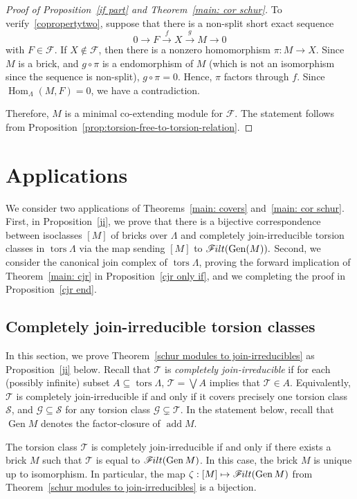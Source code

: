 \documentclass[ALCO,ThmDefs,Unicode,epreuves]{cedram}
\DeclareMathOperator{\tors}{tors}
\DeclareMathOperator{\add}{add}
\DeclareMathOperator{\Hom}{Hom}
\newcommand{\calF}{\mathcal{F}}
\newcommand{\calG}{\mathcal{G}}
\newcommand{\calS}{\mathcal{S}}
\newcommand{\calT}{\mathcal{T}}
\newcommand{\filt}{\mathscr{F}\Mk ilt}
\renewcommand{\Join}{\bigvee}
\newcommand{\Gen}{\operatorname{Gen}}
\renewcommand{\1}{\hat{1}}
\newcommand{\0}{\hat{0}}
\newcommand{\newword}[1]{\emph{#1}}
\newcommand*{\Mk}{\mkern -2mu}
\begin{document}
\begin{proof}[Proof of Proposition~\ref{if part} and Theorem~\ref{main: cor schur}]
To verify~\ref{copropertytwo}, suppose that there is a non-split short exact sequence \[ 0\rightarrow F \xrightarrow{f} X
\xrightarrow{g} M \rightarrow 0\] with $F\in \calF$.
If $X\notin \calF$, then there is a nonzero homomorphism $\pi: M\rightarrow X$.
Since $M$ is a brick, and $g\circ \pi$ is a endomorphism of $M$ (which is not an isomorphism since the sequence is non-split), $g\circ \pi=0$. 
Hence, $\pi$ factors through $f$.
Since $\Hom_\Lambda(M,F)=0$, we have a contradiction.

Therefore, $M$ is a minimal co-extending module for $\calF$.
The statement follows from Proposition~\ref{prop:torsion-free-to-torsion-relation}.
\end{proof}


\section{Applications}
We consider two applications of Theorems~\ref{main: covers} and~\ref{main: cor schur}.
First, in Proposition~\ref{ji}, we prove that there is a bijective
correspondence between isoclasses $[M]$ of bricks over $\Lambda$ and
completely join-irreducible torsion classes in $\tors \Lambda$ via the
map sending $[M]$ to $\filt(\Gen(M)).$
Second, we consider the canonical join complex of $\tors \Lambda$,
proving the forward implication of Theorem~\ref{main: cjr} in Proposition~\ref{cjr only if}, and we completing the proof in Proposition~\ref{cjr end}.

\label{sec: ji}
\subsection{Completely join-irreducible torsion classes}
In this section, we prove Theorem~\ref{schur modules to join-irreducibles} as Proposition~\ref{ji} below.
Recall that $\calT$ is \newword{completely join-irreducible} if for each (possibly infinite) subset $A\subseteq \tors \Lambda$, $\calT = \Join A $ implies that $\calT\in A$.
Equivalently, $\calT$ is completely join-irreducible if and only if it covers precisely one torsion class $\calS$, and $\calG\subseteq \calS$ for any torsion class $\calG\subsetneq \calT$.
In the statement below, recall that $\Gen M$ denotes the factor-closure of $\add M$.
\begin{proposition}\label{ji}
The torsion class $\calT$ is completely join-irreducible if and only
if there exists a brick $M$ such that $\calT$ is equal to $\filt(\Gen M)$.
In this case, the brick $M$ is unique up to isomorphism. 
In particular, the map $\zeta: [M]\mapsto \filt(\Gen M)$ from
Theorem~\ref{schur modules to join-irreducibles} is a bijection. 
\end{proposition}
\end{document}
